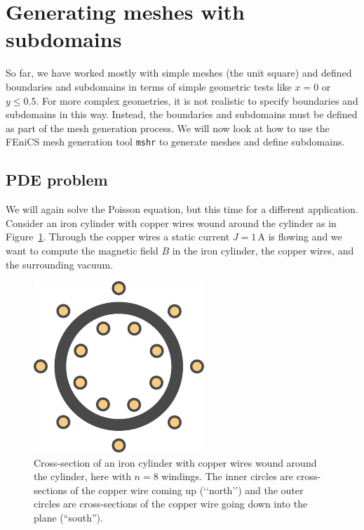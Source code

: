 \documentclass[graybox,envcountchap,sectrefs,final]{svmonodo}
\begin{document}
\section{Generating meshes with subdomains}

So far, we have worked mostly with simple meshes (the unit square) and
defined boundaries and subdomains in terms of simple geometric tests
like $x = 0$ or $y \leq 0.5$. For more complex geometries, it is not
realistic to specify boundaries and subdomains in this way. Instead,
the boundaries and subdomains must be defined as part of the mesh
generation process. We will now look at how to use the FEniCS mesh
generation tool \texttt{mshr} to generate meshes and define subdomains.

\subsection{PDE problem}


We will again solve the Poisson equation, but this time for a
different application. Consider an iron cylinder with copper wires
wound around the cylinder as in Figure~\ref{ftut1:fig:magnetostatics:geometry}. Through the copper wires a
static current $J = 1\,\mathrm{A}$ is flowing and we want to compute
the magnetic field $B$ in the iron cylinder, the copper wires, and the
surrounding vacuum.


\begin{figure}[!ht]  %
  \centerline{\includegraphics[width=0.5\linewidth]{fig/magnetostatics_geometry.pdf}}
  \caption{
  Cross-section of an iron cylinder with copper wires wound around the cylinder, here with $n = 8$ windings. The inner circles are cross-sections of the copper wire coming up (`\protect `north'') and the outer circles are cross-sections of the copper wire going down into the plane (``south''). \label{ftut1:fig:magnetostatics:geometry}
  }
\end{figure}
\end{document}
